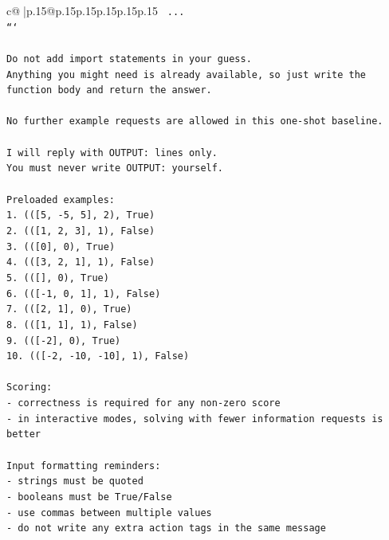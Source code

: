\documentclass{article}
\begin{document}
{\begin{supertabular}{c@{$\;$}|p{.15\linewidth}@{}p{.15\linewidth}p{.15\linewidth}p{.15\linewidth}p{.15\linewidth}p{.15\linewidth}}
{{{\texttt{    ...} \\
\texttt{```} \\
\\ 
\texttt{Do not add import statements in your guess.} \\
\texttt{Anything you might need is already available, so just write the function body and return the answer.} \\
\\ 
\texttt{No further example requests are allowed in this one{-}shot baseline.} \\
\\ 
\texttt{I will reply with OUTPUT: lines only.} \\
\texttt{You must never write OUTPUT: yourself.} \\
\\ 
\texttt{Preloaded examples:} \\
\texttt{1. (({[}5, {-}5, 5{]}, 2), True)} \\
\texttt{2. (({[}1, 2, 3{]}, 1), False)} \\
\texttt{3. (({[}0{]}, 0), True)} \\
\texttt{4. (({[}3, 2, 1{]}, 1), False)} \\
\texttt{5. (({[}{]}, 0), True)} \\
\texttt{6. (({[}{-}1, 0, 1{]}, 1), False)} \\
\texttt{7. (({[}2, 1{]}, 0), True)} \\
\texttt{8. (({[}1, 1{]}, 1), False)} \\
\texttt{9. (({[}{-}2{]}, 0), True)} \\
\texttt{10. (({[}{-}2, {-}10, {-}10{]}, 1), False)} \\
\\ 
\texttt{Scoring:} \\
\texttt{{-} correctness is required for any non{-}zero score} \\
\texttt{{-} in interactive modes, solving with fewer information requests is better} \\
\\ 
\texttt{Input formatting reminders:} \\
\texttt{{-} strings must be quoted} \\
\texttt{{-} booleans must be True/False} \\
\texttt{{-} use commas between multiple values} \\
\texttt{{-} do not write any extra action tags in the same message} \\
\\ 
}}}
\end{supertabular}}
\end{document}
